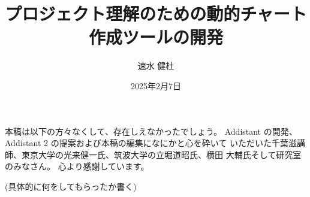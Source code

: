 \documentclass[12pt,twoside]{jbook}
\begin{document}
\title{%
プロジェクト理解のための動的チャート作成ツールの開発
}


\author{%
  速水 健杜
}

\date{2025年2月7日}






\maketitle


\begin{abstract}

\end{abstract}

\begin{acknowledgments}
本稿は以下の方々なくして、存在しえなかったでしょう。
Addistant の開発、Addistant 2 の提案および本稿の編集になにかと心を砕いて
いただいた千葉滋講師、東京大学の光来健一氏、筑波大学の立堀道昭氏、横田
大輔氏そして研究室のみなさん。
心より感謝しています。

(具体的に何をしてもらったか書く)

\end{acknowledgments}


\tableofcontents       %

%
%
\end{document}
